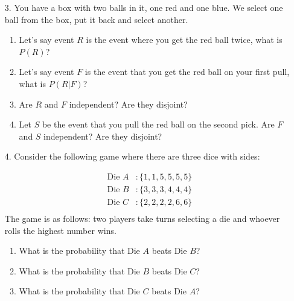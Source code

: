 \documentclass[oneside]{amsart}
\theoremstyle{definition}
\theoremstyle{definition}
\begin{document}
\begin{enumerate}
    \item[3.] You have a box with two balls in it, one red and one blue. We select one ball from the box, put it back and select another. 
    \begin{enumerate}
        \item Let's say event $R$ is the event where you get the red ball twice, what is $P(R)$?

        \vfill

        \item Let's say event $F$ is the event that you get the red ball on your first pull, what is $P(R|F)$?

        \vfill

        \item Are $R$ and $F$ independent? Are they disjoint?

        \vfill

        \item Let $S$ be the event that you pull the red ball on the second pick. Are $F$ and $S$ independent? Are they disjoint?

    \end{enumerate}
    
    \vfill

    \newpage
    
        \item[4.] Consider the following game where there are three dice with sides:

        \begin{align*}
            \text{Die }A&: \{1,1, 5, 5, 5, 5 \}  \\
            \text{Die }B&: \{3,3,3, 4, 4, 4 \}  \\
            \text{Die }C&: \{2,2,2, 2, 6, 6 \}  \\
        \end{align*}
        The game is as follows: two players take turns selecting a die and whoever rolls the highest number wins.
        \begin{enumerate}
            \item What is the probability that Die $A$ beats Die $B$?

            \vfill 
            \item What is the probability that Die $B$ beats Die $C$?

            \vfill 

            \item What is the probability that Die $C$ beats Die $A$?


\end{enumerate}
\end{enumerate}
\end{document}
